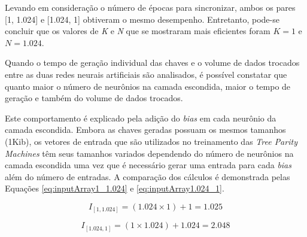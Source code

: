 \documentclass[12pt]{article}
\begin{document}
                

                Levando em consideração o número de épocas para sincronizar, ambos os pares [1, 1.024] e [1.024, 1] obtiveram o mesmo desempenho. Entretanto, pode-se concluir que os valores de \textit{K} e \textit{N} que se mostraram mais eficientes foram $K = 1$ e $N = 1.024$.
                
                Quando o tempo de geração individual das chaves e o volume de dados trocados entre as duas redes neurais artificiais são analisados, é possível constatar que quanto maior o número de neurônios na camada escondida, maior o tempo de geração e também do volume de dados trocados.
                
                Este comportamento é explicado pela adição do \textit{bias} em cada neurônio da camada escondida. Embora as chaves geradas possuam os mesmos tamanhos (1Kib), os vetores de entrada que são utilizados no treinamento das \textit{Tree Parity Machines} têm seus tamanhos variados dependendo do número de neurônios na camada escondida uma vez que é necessário gerar uma entrada para cada \textit{bias} além do número de entradas. A comparação dos cálculos é demonstrada pelas Equações \eqref{eq:inputArray1_1.024} e \eqref{eq:inputArray1.024_1}.
                
                \begin{equation}
                    \label{eq:inputArray1_1.024}
                    I_{[1, 1.024]} = (1.024 \times 1) + 1 = 1.025
                \end{equation}

                \begin{equation}
                    \label{eq:inputArray1.024_1}
                    I_{[1.024, 1]} = (1 \times 1.024) + 1.024 = 2.048
                \end{equation}
                
\end{document}
